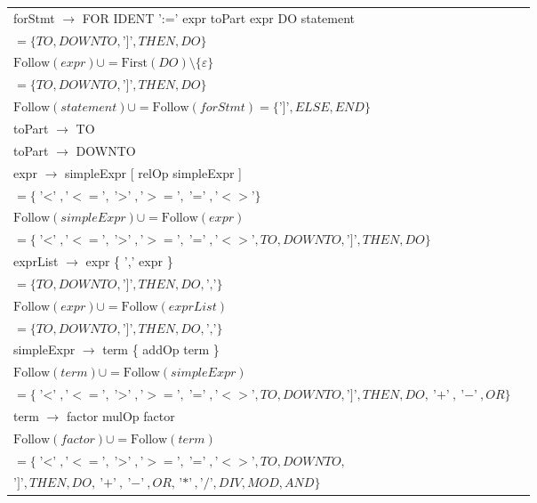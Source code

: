 \documentclass[8pt]{scrartcl}
\newcommand{\First}[1]{\mathrm{First}(#1)}
\newcommand{\Follow}[1]{\mathrm{Follow}(#1)}
\newcommand{\epsset}{\{\varepsilon\}}
\begin{document}
\begin{itemize}
\begin{tabular}{|l|l|}
                    forStmt $\rightarrow$ FOR IDENT ':=' expr toPart expr DO statement & \makecell[l]{$\Follow{expr} \cup = \First{toPart} \setminus \epsset $\\ $= \{TO, DOWNTO, \text{']'}, THEN, DO\}$\\$\Follow{expr} \cup = \First{DO} \setminus \epsset $\\ $= \{TO, DOWNTO, \text{']'}, THEN, DO\}$\\ $\Follow{statement} \cup = \Follow{forStmt} = \{\text{'$]$'}, ELSE, END\}$}\\
                    \hline
                    toPart $\rightarrow$ TO & \\
                    \hline
                    toPart $\rightarrow$ DOWNTO & \\
                    \hline
                    expr $\rightarrow$ simpleExpr [ relOp simpleExpr ] & \makecell[l]{$\Follow{simpleExpr} \cup = \First{relOp} \setminus \epsset $\\ $= \{\text{'$<$'}, \text{'$<=$'}, \text{'$>$'}, \text{'$>=$'}, \text{'$=$'}, \text{'$<>$'}\}$\\ $\Follow{simpleExpr} \cup = \Follow{expr} $\\ $= \{\text{'$<$'}, \text{'$<=$'}, \text{'$>$'}, \text{'$>=$'}, \text{'$=$'}, \text{'$<>$'}, TO, DOWNTO, \text{'$]$'}, THEN, DO\}$}\\
                    \hline
                    exprList $\rightarrow$ expr \{ ',' expr \} & \makecell[l]{$\Follow{expr} \cup = \First{\text{','}} \setminus \epsset $\\ $= \{TO, DOWNTO, \text{']'}, THEN, DO, \text{','}\}$\\ $\Follow{expr} \cup = \Follow{exprList} $\\ $= \{TO, DOWNTO, \text{']'}, THEN, DO, \text{','}\}$}\\
                    \hline
                    simpleExpr $\rightarrow$ term \{ addOp term \} & \makecell[l]{$\Follow{term} \cup = \First{addOp} \setminus \epsset = \{\text{'$+$'}, \text{'$-$'}, OR\}$\\ $\Follow{term} \cup = \Follow{simpleExpr} $\\ $= \{\text{'$<$'}, \text{'$<=$'}, \text{'$>$'}, \text{'$>=$'}, \text{'$=$'}, \text{'$<>$'}, TO, DOWNTO, \text{'$]$'}, THEN, DO, \text{'$+$'}, \text{'$-$'}, OR\}$}\\
                    \hline
                    term $\rightarrow$ factor { mulOp factor } & \makecell[l]{$\Follow{factor} \cup = \First{mulOp} \setminus \epsset = \{\text{'$*$'}, \text{'$/$'}, DIV, MOD, AND\}$\\$\Follow{factor} \cup = \Follow{term} $\\ $= \{\text{'$<$'}, \text{'$<=$'}, \text{'$>$'}, \text{'$>=$'}, \text{'$=$'}, \text{'$<>$'}, TO, DOWNTO,$\\$ \text{'$]$'}, THEN, DO, \text{'$+$'}, \text{'$-$'}, OR, \text{'$*$'}, \text{'$/$'}, DIV, MOD, AND\}$}\\

\end{tabular}
\end{itemize}
\end{document}
